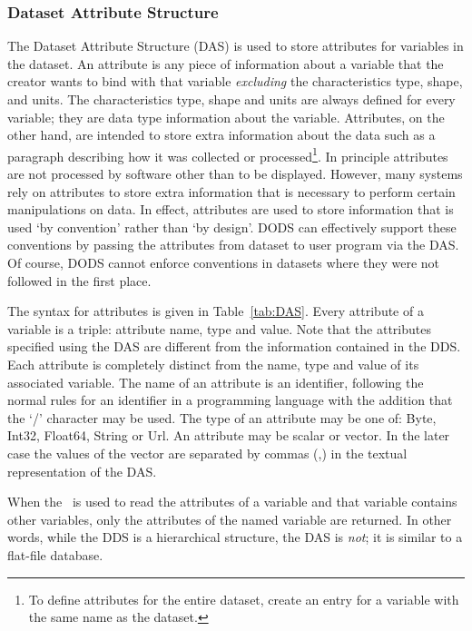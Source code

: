 \subsubsection{Dataset Attribute Structure}
\label{api:das}

The Dataset Attribute Structure (DAS) is used to store attributes for
variables in the dataset. An attribute is any piece of information
about a variable that the creator wants to bind with that variable
{\em excluding\/} the characteristics type, shape, and units. The
characteristics type, shape and units are always defined for every
variable; they are data type information about the
variable. Attributes, on the other hand, are intended to store extra
information about the data such as a paragraph describing how it was
collected or processed\footnote{To define attributes for the entire
  dataset, create an entry for a variable with the same name as the
  dataset.}. In principle attributes are not processed by software
other than to be displayed. However, many systems rely on attributes
to store extra information that is necessary to perform certain
manipulations on data. In effect, attributes are used to store
information that is used `by convention' rather than `by design'. DODS
can effectively support these conventions by passing the attributes
from dataset to user program via the DAS\@. Of course, DODS cannot
enforce conventions in datasets where they were not followed in the
first place.

The syntax for attributes is given in Table~\ref{tab:DAS}. Every
attribute of a variable is a triple: attribute name, type and
value. Note that the attributes specified using the DAS are different
from the information contained in the DDS\@. Each attribute is
completely distinct from the name, type and value of its associated
variable. The name of an attribute is an identifier, following the
normal rules for an identifier in a programming language with the
addition that the `/' character may be used. The type of an attribute
may be one of: Byte, Int32, Float64, String or Url. An attribute may
be scalar or vector. In the later case the values of the vector are
separated by commas (,) in the textual representation of the DAS\@.

When the \dap\ is used to read the attributes of a variable and that
variable contains other variables, only the attributes of the named
variable are returned. In other words, while the DDS is a hierarchical
structure, the DAS is {\em not\/}; it is similar to a flat-file
database.

